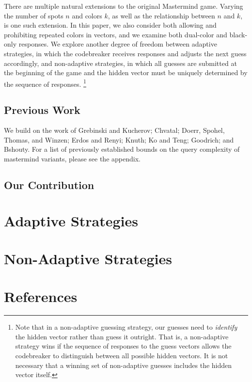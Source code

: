 \documentclass[12pt, a4paper]{article}
\begin{document}
There are multiple natural extensions to the original Mastermind game. Varying the
number of spots $n$ and colors $k$, as well as the relationship between $n$ and $k$,
is one such extension. In this paper, we also consider both allowing and prohibiting
repeated colors in vectors, and we examine both dual-color and black-only responses.
We explore another degree of freedom between adaptive strategies, in which the
codebreaker receives responses and adjusts the next guess accordingly, and non-adaptive
strategies, in which all guesses are submitted at the beginning of the
game and the hidden vector must be uniquely determined by the sequence of responses.
\footnote{Note that in a non-adaptive guessing strategy, our guesses need to
\textit{identify} the hidden vector rather than guess it outright. That is, a
non-adaptive strategy wins if the sequence of responses to the guess vectors allows
the codebreaker to distinguish between all possible hidden vectors. It is not
necessary that a winning set of non-adaptive guesses includes the hidden vector
itself.}

\subsection{Previous Work}
We build on the work of Grebinski and Kucherov; Chvatal; Doerr, Spohel, Thomas, and
Winzen; Erdos and Renyi; Knuth; Ko and Teng; Goodrich; and Bshouty. For a list of
previously established bounds on the query complexity of mastermind variants, please
see the appendix.

\subsection{Our Contribution}


\section{Adaptive Strategies}


\section{Non-Adaptive Strategies}


\clearpage
\section*{References}
\end{document}
